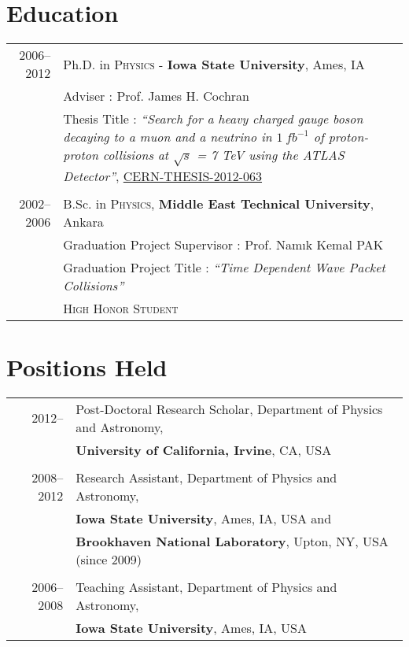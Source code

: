 \documentclass[a4paper,10pt]{article}
\begin{document}
\vspace{3mm}
\section{Education}

\begin{tabular}{r | p{15.5cm}}
\textsc{2006--2012}				&  Ph.D. in \textsc{Physics} - \textbf{Iowa State University}, Ames, IA \\ 
							& Adviser\phantom{Ttle} : Prof. James H. Cochran \\
							& Thesis Title : {\it``Search for a heavy charged gauge boson decaying to a 
							    muon and a neutrino in $1\ fb^{-1}$ of proton-proton collisions 
							    at $\sqrt{s}$ = 7 TeV using the ATLAS Detector''}, \href{http://cds.cern.ch/record/1454661}{CERN-THESIS-2012-063} \\	
\multicolumn{2}{c}{} \\
\textsc{2002--2006} 				& B.Sc. in \textsc{Physics}, \textbf{Middle East Technical University}, Ankara	\\
							& Graduation Project Supervisor : Prof. Nam{\i}k Kemal \textsc{PAK}					\\
							& Graduation Project Title \phantom{rvsor} : \it{``Time Dependent Wave Packet Collisions''} 	\\
							& \normalsize \textsc{High Honor Student}										\\
\end{tabular}

\vspace{3mm}
\section{Positions Held}
\begin{tabular}{r|p{15.5cm}}
\textsc{2012--\phantom{0000}}		&		Post-Doctoral Research Scholar, Department of Physics and Astronomy, 	\\
							&		{\bf University of California, Irvine}, CA, USA  						\\
\multicolumn{2}{c}{} \\
\textsc{2008--2012}				&		Research Assistant, Department of Physics and Astronomy, 			\\
							&		{\bf Iowa State University}, Ames, IA, USA and 						\\
							& 		{\bf Brookhaven National Laboratory}, Upton, NY, USA (since 2009)		\\
\multicolumn{2}{c}{} \\
\textsc{2006--2008}				&		Teaching Assistant, Department of Physics and Astronomy, 			\\
							&		{\bf Iowa State University}, Ames, IA, USA 						\\
\end{tabular}
\end{document}
